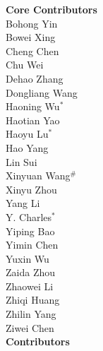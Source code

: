 \documentclass{article}
\begin{document}
\begin{multicols}{2}
\noindent
\textbf{Core Contributors} \\

Bohong Yin \\
Bowei Xing \\
Cheng Chen \\
Chu Wei \\
Dehao Zhang \\
Dongliang Wang \\
Haoning Wu$^*$ \\
Haotian Yao \\
Haoyu Lu$^*$ \\
Hao Yang \\
Lin Sui \\
Xinyuan Wang${^\#}$ \\
Xinyu Zhou \\
Yang Li \\
Y. Charles$^*$ \\
Yiping Bao \\
Yimin Chen \\
Yuxin Wu \\
Zaida Zhou \\
Zhaowei Li \\
Zhiqi Huang \\
Zhilin Yang \\
Ziwei Chen \\


\textbf{Contributors} \\


\end{multicols}
\end{document}
